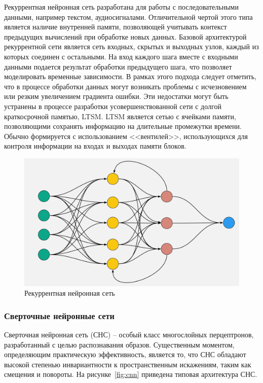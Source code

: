 Рекуррентная нейронная сеть разработана для работы с последовательными данными, например текстом, аудиосигналами\cite{rostovtsev_neural}. Отличительной чертой этого типа является наличие внутренней памяти, позволяющей учитывать контекст предыдущих вычислений при обработке новых данных. Базовой архитектурой рекуррентной сети является сеть входных, скрытых и выходных узлов, каждый из которых соединен с остальными. На вход каждого шага вместе с входными данными подается результат обработки предыдущего шага, что позволяет моделировать временные зависимости. В рамках этого подхода следует отметить, что в процессе обработки данных могут возникать проблемы с исчезновением или резким увеличением градиента ошибки. Эти недостатки могут быть устранены в процессе разработки усовершенствованной сети с долгой краткосрочной памятью, LTSM. LTSM является сетью с ячейками памяти, позволяющими сохранять информацию на длительные промежутки времени. Обычно формируется с использованием <<вентилей>>, использующихся для контроля информации на входах и выходах памяти блоков.

\begin{figure}[h]
	\centering
	\includegraphics[width=0.7\linewidth]{images/RNN}
	\caption{Рекуррентная нейронная сеть}
	\label{fig:rnn}
\end{figure}

\subsubsection{Сверточные нейронные сети}

Сверточная нейронная сеть (СНС) -- особый класс многослойных перцептронов, разработанный с целью распознавания образов\cite{bychkov_cnn}. Существенным моментом, определяющим практическую эффективность, является то, что СНС обладают высокой степенью инвариантности к пространственным искажениям, таким как смещения и повороты. На рисунке~\ref{fig:cnn} приведена типовая архитектура СНС.

